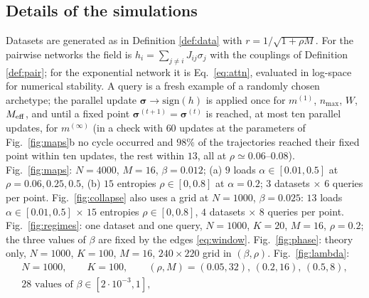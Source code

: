 \documentclass{SciPost}
\theoremstyle{plain}
\theoremstyle{definition}
\newcommand{\s}{\bm{\sigma}}
\newcommand{\Meff}{M_{\rm eff}}
\newcommand{\sgn}{\mathrm{sign}}
\begin{document}
\begin{appendix}

\section{Details of the simulations}
Datasets are generated as in Definition \ref{def:data} with $r=1/\sqrt{1+\rho M}$. For the pairwise networks the field is $h_i=\sum_{j\ne i}J_{ij}\sigma_j$ with the couplings of Definition \ref{def:pair}; for the exponential network it is Eq.\ \eqref{eq:attn}, evaluated in log-space for numerical stability. A query is a fresh example of a randomly chosen archetype; the parallel update $\s\to\sgn(h)$ is applied once for $m^{(1)}$, $n_{\max}$, $W$, $\Meff$, and until a fixed point $\s^{(t+1)}=\s^{(t)}$ is reached, at most ten parallel updates, for $m^{(\infty)}$ (in a check with $60$ updates at the parameters of Fig.\ \ref{fig:maps}b no cycle occurred and $98\%$ of the trajectories reached their fixed point within ten updates, the rest within $13$, all at $\rho\simeq0.06$--$0.08$). Fig.\ \ref{fig:maps}: $N=4000$, $M=16$, $\beta=0.012$; (a) $9$ loads $\alpha\in[0.01,0.5]$ at $\rho=0.06,0.25,0.5$, (b) $15$ entropies $\rho\in[0,0.8]$ at $\alpha=0.2$; $3$ datasets $\times$ $6$ queries per point. Fig.\ \ref{fig:collapse} also uses a grid at $N=1000$, $\beta=0.025$: $13$ loads $\alpha\in[0.01,0.5]$ $\times$ $15$ entropies $\rho\in[0,0.8]$, $4$ datasets $\times$ $8$ queries per point. Fig.\ \ref{fig:regimes}: one dataset and one query, $N=1000$, $K=20$, $M=16$, $\rho=0.2$; the three values of $\beta$ are fixed by the edges \eqref{eq:window}. Fig.\ \ref{fig:phase}: theory only, $N=1000$, $K=100$, $M=16$, $240\times220$ grid in $(\beta,\rho)$. Fig.\ \ref{fig:lambda}:
\begin{gather*}
N=1000,\qquad K=100,\qquad (\rho,M)=(0.05,32),\,(0.2,16),\,(0.5,8),\\
28\text{ values of }\beta\in[2\cdot10^{-3},1],
\end{gather*}

\end{appendix}
\end{document}
